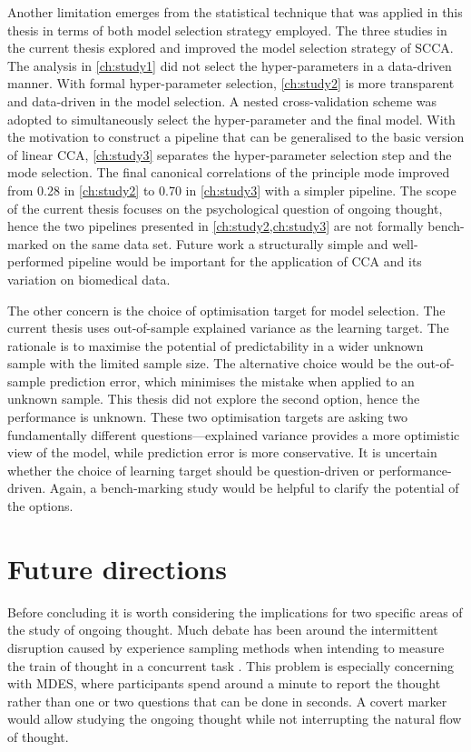 Another limitation emerges from the statistical technique that was applied in this thesis in terms of both model selection strategy employed. The three studies in the current thesis explored and improved the model selection strategy of SCCA. The analysis in \cref{ch:study1} did not select the hyper-parameters in a data-driven manner. With formal hyper-parameter selection, \cref{ch:study2} is more transparent and data-driven in the model selection. A nested cross-validation scheme was adopted to simultaneously select the hyper-parameter and the final model. With the motivation to construct a pipeline that can be generalised to the basic version of linear CCA, \cref{ch:study3} separates the hyper-parameter selection step and the mode selection. The final canonical correlations of the principle mode improved from 0.28 in \cref{ch:study2} to 0.70 in \cref{ch:study3} with a simpler pipeline. The scope of the current thesis focuses on the psychological question of ongoing thought, hence the two pipelines presented in \cref{ch:study2,ch:study3} are not formally bench-marked on the same data set. Future work a structurally simple and well-performed pipeline would be important for the application of CCA and its variation on biomedical data.

The other concern is the choice of optimisation target for model selection. The current thesis uses out-of-sample explained variance as the learning target. The rationale is to maximise the potential of predictability in a wider unknown sample with the limited sample size. The alternative choice would be the out-of-sample prediction error, which minimises the mistake when applied to an unknown sample. This thesis did not explore the second option, hence the performance is unknown. These two optimisation targets are asking two fundamentally different questions---explained variance provides a more optimistic view of the model, while prediction error is more conservative. It is uncertain whether the choice of learning target should be question-driven or performance-driven. Again, a bench-marking study would be helpful to clarify the potential of the options. 



\section{Future directions}

Before concluding it is worth considering the implications for two specific areas of the study of ongoing thought. Much debate has been around the intermittent disruption caused by experience sampling methods when intending to measure the train of thought in a concurrent task \cite{SmallwoodSchooler2006}. This problem is especially concerning with MDES, where participants spend around a minute to report the thought rather than one or two questions that can be done in seconds. A covert marker would allow studying the ongoing thought while not interrupting the natural flow of thought.

